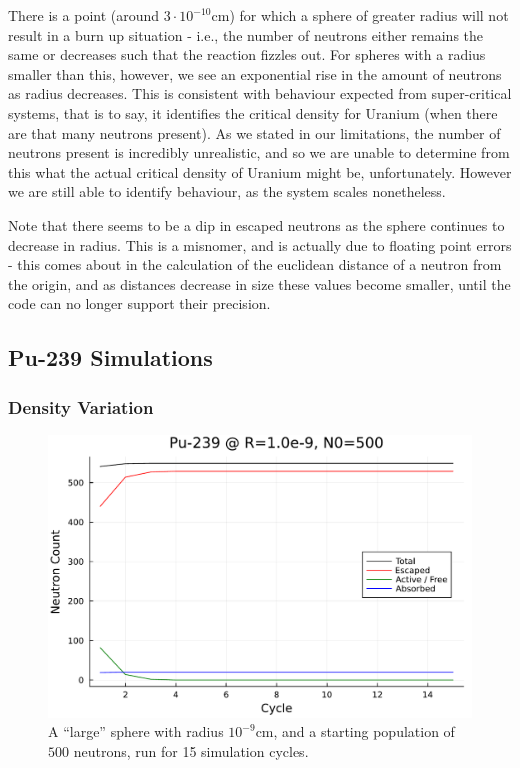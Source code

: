 There is a point (around $3 \cdot 10^{-10} \text{cm}$) for which 
a sphere of greater radius will not result in a burn up situation - i.e., the number of neutrons either remains the same or 
decreases such that the reaction fizzles out. For spheres with a radius smaller than this, however, we see an exponential rise in the amount 
of neutrons as radius decreases. This is consistent with behaviour expected from super-critical systems, that is to say, 
it identifies the critical density for Uranium (when there are that many neutrons present). As we stated in our limitations, 
the number of neutrons present is incredibly unrealistic, and so we are unable to determine from this what the actual 
critical density of Uranium might be, unfortunately. However we are still able to identify behaviour, as the system scales nonetheless.

Note that there seems to be a dip in escaped neutrons as the sphere continues to decrease in radius. This is a misnomer, and 
is actually due to floating point errors - this comes about in the calculation of the euclidean distance of a neutron from 
the origin, and as distances decrease in size these values become smaller, until the code can no longer support their precision.

\subsection{Pu-239 Simulations}

\subsubsection{Density Variation}

\begin{figure}[h!]
    \centering
    \includegraphics[scale=0.55]{imgs/neutron-count-plutonium-large-sphere.pdf}
    \caption{A ``large'' sphere with radius $10^{-9}$cm, and a starting population of $500$ neutrons, run for 15 simulation 
    cycles.}
\end{figure}

